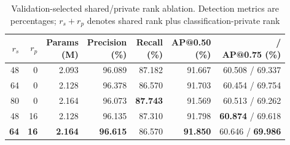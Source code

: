 \begin{table}[!t]
\caption{Validation-selected shared/private rank ablation. Detection metrics are percentages; $r_s+r_p$ denotes shared rank plus classification-private rank\label{tab:rank}}
\centering\srpatablesetup
\begin{tabular}{rrrrrrr}
\toprule
$r_s$ & $r_p$ & \shortstack{Params\\(M)} & \shortstack{Precision\\(\%)} & \shortstack{Recall\\(\%)} & \shortstack{AP@0.50\\(\%)} & \shortstack{\mapall{} /\\AP@0.75 (\%)}\\
\midrule
48 & 0  & 2.093 & 96.089 & 87.182 & 91.667 & 60.508 / 69.337\\
64 & 0  & 2.128 & 96.378 & 86.570 & 91.703 & 60.454 / 69.754\\
80 & 0  & 2.164 & 96.073 & \textbf{87.743} & 91.569 & 60.513 / 69.262\\
48 & 16 & 2.128 & 96.135 & 87.310 & 91.798 & \textbf{60.874} / 69.618\\
\textbf{64} & \textbf{16} & \textbf{2.164} & \textbf{96.615} & 86.570 & \textbf{91.850} & 60.646 / \textbf{69.986}\\
\bottomrule
\end{tabular}
\end{table}
